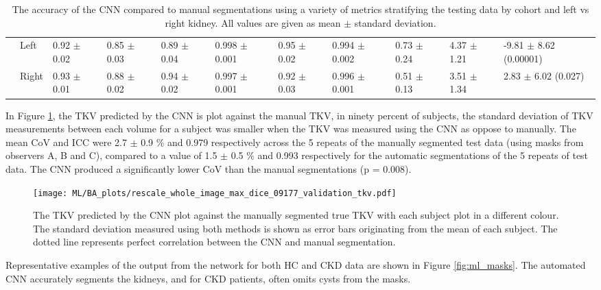 \begin{landscape}
\begin{table}[H]
\begin{adjustbox}{width=\hsize, center}
\begin{tabularx}{1.3\hsize}{XX||X|X|X|X|X|X|X|X|X}
		& Left   & 0.92 $\pm$ 0.02   & 0.85 $\pm$ 0.03     & 0.89 $\pm$ 0.04   & 0.998 $\pm$ 0.001   & 0.95 $\pm$ 0.02   & 0.994 $\pm$ 0.002   & 0.73 $\pm$ 0.24                  & 4.37 $\pm$ 1.21                                 & -9.81 $\pm$ 8.62   (0.00001) \\ \cline{2-11} 
		& Right  & 0.93 $\pm$   0.01 & 0.88 $\pm$   0.02   & 0.94 $\pm$   0.02 & 0.997   $\pm$ 0.001 & 0.92 $\pm$   0.03 & 0.996   $\pm$ 0.001 & 0.51 $\pm$   0.13                & 3.51 $\pm$   1.34                               & 2.83 $\pm$   6.02 (0.027)   
	\end{tabularx}
	\end{adjustbox}
	\caption{The accuracy of the \ac{CNN} compared to manual segmentations using a variety of metrics stratifying the testing data by cohort and left vs right kidney. All values are given as mean $\pm$ standard deviation. }
	\label{tab:ml_testing_metrics}
\end{table}
\end{landscape}

In Figure \ref{fig:ml_testing_corr}, the \ac{TKV} predicted by the CNN is plot against the manual \ac{TKV}, in ninety percent of subjects, the standard deviation of \ac{TKV} measurements between each volume for a subject was smaller when the \ac{TKV} was measured using the \ac{CNN} as oppose to manually. The mean \ac{CoV} and \ac{ICC} were 2.7 $\pm$ 0.9 \% and 0.979 respectively across the 5 repeats of the manually segmented test data (using masks from observers A, B and C), compared to a value of 1.5 $\pm$ 0.5 \% and 0.993 respectively for the automatic segmentations of the 5 repeats of test data. The \ac{CNN} produced a significantly lower \ac{CoV} than the manual segmentations (p = 0.008).

\begin{figure}[H]
	\centering
	\texttt{[image: ML/BA\_plots/rescale\_whole\_image\_max\_dice\_09177\_validation\_tkv.pdf]}
	\caption{The \ac{TKV} predicted by the \ac{CNN} plot against the manually segmented true \ac{TKV} with each subject plot in a different colour. The standard deviation measured using both methods is shown as error bars originating from the mean of each subject. The dotted line represents perfect correlation between the \ac{CNN} and manual segmentation.}
	\label{fig:ml_testing_corr}	
\end{figure}

Representative examples of the output from the network for both \ac{HC} and \ac{CKD} data are shown in Figure \ref{fig:ml_masks}. The automated \ac{CNN} accurately segments the kidneys, and for \ac{CKD} patients, often omits cysts from the masks. 


